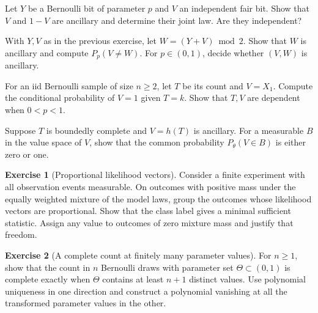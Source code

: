 \documentclass[11pt,oneside]{book}
\theoremstyle{definition}
\newtheorem{exercise}{Exercise}[section]
\theoremstyle{remark}
\begin{document}
\begin{practiceexercise}
\label{pex:ancillary-dependent-statistics}
Let $Y$ be a Bernoulli bit of parameter $p$ and $V$ an independent fair bit.
Show that $V$ and $1-V$ are ancillary and determine their joint law.
Are they independent?
\end{practiceexercise}

\begin{practiceexercise}
\label{pex:ancillary-pair-informative}
With $Y,V$ as in the previous exercise, let $W=(Y+V)\bmod2$.
Show that $W$ is ancillary and compute $P_p(V\ne W)$.
For $p\in(0,1)$, decide whether $(V,W)$ is ancillary.
\end{practiceexercise}

\begin{practiceexercise}
\label{pex:basu-nonancillary-event}
For an iid Bernoulli sample of size $n\geq2$, let $T$ be its count
and $V=X_1$. Compute the conditional probability of $V=1$ given
$T=k$. Show that $T,V$ are dependent when $0<p<1$.
\end{practiceexercise}

\begin{practiceexercise}
\label{pex:ancillary-function-complete}
Suppose $T$ is boundedly complete and $V=h(T)$ is ancillary.
For a measurable $B$ in the value space of $V$, show that the
common probability $P_\theta(V\in B)$ is either zero or one.
\end{practiceexercise}

\begin{exercise}[Proportional likelihood vectors]
\label{exer:minimal-finite-likelihood-vectors}
Consider a finite experiment with all observation events measurable.
On outcomes with positive mass under the equally weighted mixture
of the model laws, group the outcomes whose likelihood vectors are
proportional. Show that the class label gives a minimal sufficient
statistic. Assign any value to outcomes of zero mixture mass and
justify that freedom.
\end{exercise}

\begin{exercise}[A complete count at finitely many parameter values]
\label{exer:complete-binomial-finite-parameter-set}
For $n\geq1$, show that the count in $n$ Bernoulli draws with
parameter set $\Theta\subset(0,1)$ is complete exactly when
$\Theta$ contains at least $n+1$ distinct values. Use polynomial
uniqueness in one direction and construct a polynomial vanishing
at all the transformed parameter values in the other.
\end{exercise}
\end{document}
